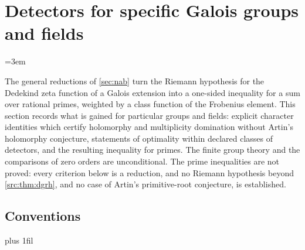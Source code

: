 \providecommand{\hecsgn}{\operatorname{sgn}}
\providecommand{\hecVar}{\operatorname{Var}}
\providecommand{\hecCov}{\operatorname{Cov}}
\providecommand{\hecE}{\mathbb{E}}
\providecommand{\hecind}{\mathbf{1}}
\providecommand{\nabFix}{\operatorname{Fix}}
\providecommand{\nabIrr}{\operatorname{Irr}}
\providecommand{\nabsgn}{\operatorname{sgn}}
\providecommand{\nabone}{\mathbf{1}}
\providecommand{\nabpos}[1]{(#1)^{+}}
\section{Detectors for specific Galois groups and fields}\label{sec:grp}

\providecommand{\grpIrr}{\operatorname{Irr}}
\providecommand{\grpSt}{\mathrm{St}}
\providecommand{\grpFix}{\operatorname{Fix}}
\providecommand{\grpsgn}{\operatorname{sgn}}
\providecommand{\grpstd}{\mathrm{std}}
\providecommand{\grpone}{\mathbf{1}}
\providecommand{\grpDiff}{\mathfrak{D}}
\providecommand{\grprd}{\operatorname{rd}}
\providecommand{\grppos}[1]{#1^{+}}
\begingroup\emergencystretch=3em

The general reductions of \cref{sec:nab} turn the Riemann hypothesis for the
Dedekind zeta function of a Galois extension into a one-sided inequality for a
sum over rational primes, weighted by a class function of the Frobenius
element. This section records what is gained for particular groups and fields:
explicit character identities which certify holomorphy and multiplicity
domination without Artin's holomorphy conjecture, statements of optimality
within declared classes of detectors, and the resulting inequality for primes.
The finite group theory and the comparisons of zero orders are unconditional.
The prime inequalities are not proved: every criterion below is a reduction,
and no Riemann hypothesis beyond \cref{src:thm:dgrh}, and no case of Artin's
primitive-root conjecture, is established.

\subsection{Conventions}\label{grp:sec:conv}
{\rightskip=0pt plus 1fil\relax
{}
}

